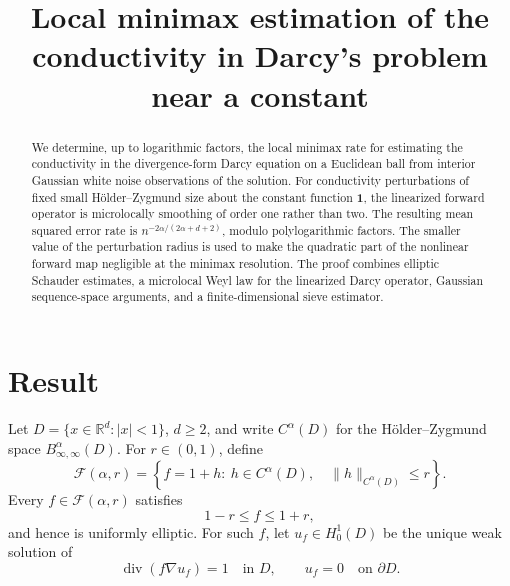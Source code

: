 \documentclass[11pt]{article}
\numberwithin{equation}{section}
\theoremstyle{remark}
\DeclareMathOperator{\divg}{div}
\newcommand{\R}{\mathbb R}
\newcommand{\bone}{\mathbf 1}
\newcommand{\cF}{\mathcal F}
\begin{document}
\title{Local minimax estimation of the conductivity in Darcy's problem near a constant}
\author{}
\date{}
\maketitle

\begin{abstract}
We determine, up to logarithmic factors, the local minimax rate for estimating
the conductivity in the divergence-form Darcy equation on a Euclidean ball from
interior Gaussian white noise observations of the solution.  For conductivity
perturbations of fixed small H\"older--Zygmund size about the constant function
$\bone$, the linearized forward operator is microlocally smoothing of order one
rather than two.  The resulting mean squared error rate is
$n^{-2\alpha/(2\alpha+d+2)}$, modulo polylogarithmic factors.  The smaller value
of the perturbation radius is used to make the quadratic part of the nonlinear
forward map negligible at the minimax resolution.  The proof combines elliptic
Schauder estimates, a microlocal Weyl law for the linearized Darcy operator,
Gaussian sequence-space arguments, and a finite-dimensional sieve estimator.
\end{abstract}

\section{Result}

Let $D=\{x\in\R^d:|x|<1\}$, $d\ge 2$, and write $C^\alpha(D)$ for the
H\"older--Zygmund space $B^\alpha_{\infty,\infty}(D)$.  For $r\in(0,1)$, define
\[
\cF(\alpha,r)
=
\left\{f=1+h:\ h\in C^\alpha(D),\quad
       \|h\|_{C^\alpha(D)}\le r\right\}.
\]
Every $f\in\cF(\alpha,r)$ satisfies
\[
1-r\le f\le 1+r,
\]
and hence is uniformly elliptic.  For such $f$, let $u_f\in H^1_0(D)$ be the
unique weak solution of
\begin{equation}\label{eq:Darcy}
\divg(f\nabla u_f)=1\quad\text{in }D,
\qquad
u_f=0\quad\text{on }\partial D.
\end{equation}
\end{document}
